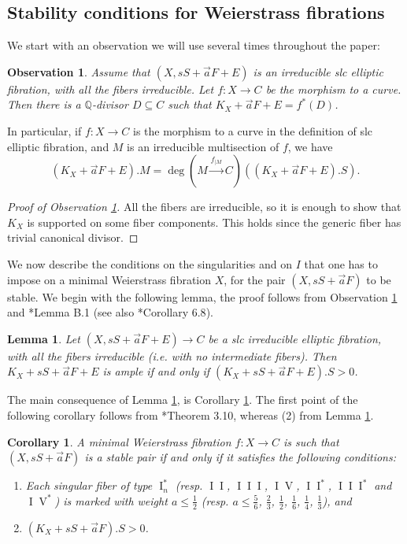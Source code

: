 \documentclass[11pt]{amsart}
\newcommand{\I}{\operatorname{I}}
\newtheorem{Lemma}[theorem]{Lemma}
\newtheorem{Oss}[theorem]{Observation}
\newtheorem{Cor}[theorem]{Corollary}
\theoremstyle{definition}
\begin{document}
\subsection{Stability conditions for Weierstrass fibrations}
We start with an observation we will use several times throughout the paper:
\begin{Oss}\label{Oss:all:fib:irred:implies:pulback}
 Assume that $(X,sS+\vec{a}F+E)$ is an irreducible slc elliptic fibration, with all the fibers irreducible. Let $f:X \to C$ be the morphism to a curve.
 Then there is a $\mathbb{Q}$-divisor $D \subseteq C$ such that $K_X+\vec{a}F+E=f^*(D)$. 
\end{Oss}
In particular, if $f:X \to C$ is the morphism to a curve in the definition of slc elliptic fibration, and $M$ is an irreducible
multisection of $f$, we have
 $$(K_X+\vec{a}F+E).M=\deg(M \xrightarrow{f_{|M}}C)((K_X+\vec{a}F+E).S).$$
\begin{proof}[Proof of Observation \ref{Oss:all:fib:irred:implies:pulback}]
All the fibers are irreducible, so it is enough to show that $K_X$ is supported on some fiber components. This holds since the generic fiber has trivial canonical divisor.
\end{proof}
We now describe the conditions on the singularities and on $I$ that one has to impose on a minimal
Weierstrass fibration $X$, for the pair $(X,sS+\vec{a}F)$ to be stable.
We begin with the following lemma, the proof follows from Observation \ref{Oss:all:fib:irred:implies:pulback} and \cite{AB3}*{Lemma B.1} (see also \cite{AB1}*{Corollary 6.8}).
\begin{Lemma}\label{Lemma:if:all:fibers:irred:if:we:dont:contract:the:section:it:is:stable}
 Let $(X,sS+\vec{a}F+E) \to C$ be a slc irreducible elliptic fibration, with all the fibers irreducible (i.e. with no intermediate fibers).
 Then $K_X+sS+\vec{a}F+E$ is ample if and only if $(K_X+sS+\vec{a}F+E).S>0$.
\end{Lemma}
The main consequence of Lemma \ref{Lemma:if:all:fibers:irred:if:we:dont:contract:the:section:it:is:stable}, is Corollary \ref{Cor:stability:condition:for:minimal:W:fibration}.
The first point of the following corollary follows from \cite{AB3}*{Theorem 3.10}, whereas (2) from Lemma \ref{Lemma:if:all:fibers:irred:if:we:dont:contract:the:section:it:is:stable}.
\begin{Cor}\label{Cor:stability:condition:for:minimal:W:fibration}
A minimal Weierstrass fibration $f:X \to C$ is such that $(X,sS+\vec{a}F)$ is a stable pair if and only if it satisfies the following conditions:
\begin{enumerate}
 \item Each singular fiber of type $\operatorname{I}_n^*$ (resp. $\I \I$, $\I\I\I$, $\I\operatorname{V}$, $\I\I^*$, $\I\I\I^*$ and
 $\I\operatorname{V}^*$) is marked with weight $a \le \frac{1}{2}$ (resp. $a \le \frac{5}{6}$, $\frac{2}{3}$, $\frac{1}{2}$, $\frac{1}{6}$,
 $\frac{1}{4}$, $\frac{1}{3}$), and
 \item $(K_X+sS+\vec{a}F).S>0$.
\end{enumerate}
\end{Cor}
\end{document}
